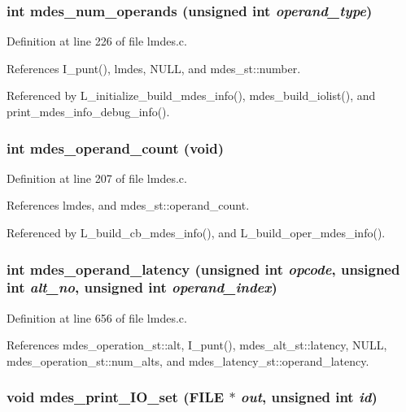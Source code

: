 \subsubsection{\setlength{\rightskip}{0pt plus 5cm}int mdes\_\-num\_\-operands (unsigned int {\em operand\_\-type})}\label{lmdes_8c_16c4bed2c322b1d117acf2ad16a06f1c}




Definition at line 226 of file lmdes.c.

References I\_\-punt(), lmdes, NULL, and mdes\_\-st::number.

Referenced by L\_\-initialize\_\-build\_\-mdes\_\-info(), mdes\_\-build\_\-iolist(), and print\_\-mdes\_\-info\_\-debug\_\-info().
\subsubsection{\setlength{\rightskip}{0pt plus 5cm}int mdes\_\-operand\_\-count (void)}\label{lmdes_8c_89ed8771e0c0f175530396acc020c4fe}




Definition at line 207 of file lmdes.c.

References lmdes, and mdes\_\-st::operand\_\-count.

Referenced by L\_\-build\_\-cb\_\-mdes\_\-info(), and L\_\-build\_\-oper\_\-mdes\_\-info().
\subsubsection{\setlength{\rightskip}{0pt plus 5cm}int mdes\_\-operand\_\-latency (unsigned int {\em opcode}, unsigned int {\em alt\_\-no}, unsigned int {\em operand\_\-index})}\label{lmdes_8c_8d6617c093d8f85c8fd4a7f493b2341e}




Definition at line 656 of file lmdes.c.

References mdes\_\-operation\_\-st::alt, I\_\-punt(), mdes\_\-alt\_\-st::latency, NULL, mdes\_\-operation\_\-st::num\_\-alts, and mdes\_\-latency\_\-st::operand\_\-latency.
\subsubsection{\setlength{\rightskip}{0pt plus 5cm}void mdes\_\-print\_\-IO\_\-set (FILE $\ast$ {\em out}, unsigned int {\em id})}\label{lmdes_8c_443caf6000199806854433e428d252b5}




